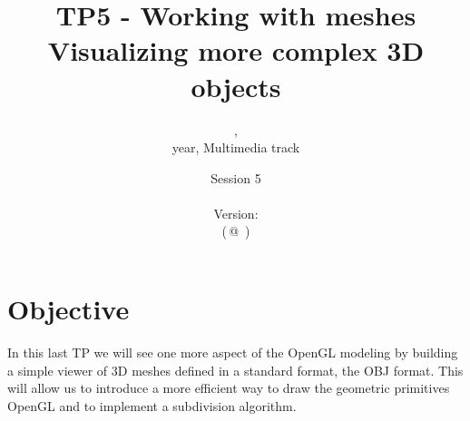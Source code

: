 \documentclass[a4paper,11pt]{article}
\title{\sf\bfseries TP5 - Working with meshes \\ {\small Visualizing more complex 3D objects}}
\author{\course, \ayearSecond\\ \nth{2} year, Multimedia track}
\date{Session 5\\~\\{\small Version: \gitReln{} \\\vskip -2mm {\tiny (\gitBranch\,@\,\gitAbbrevHash{} \gitAuthorDate)}}}
\newcommand{\hilight}[1]{\colorbox{bg}{#1}}
\newcommand{\coden}[1]{\texttt{#1}}
\newcommand{\code}[1]{\hilight{\texttt{#1}}}
\newcommand{\brand}[1]{\textsf{#1}\xspace}
\newcommand{\opengl}{\brand{OpenGL}}
\newcommand{\GLUT}{\brand{GLUT}}
\newcommand{\glut}{\GLUT}
\newcommand{\obj}{\brand{OBJ}}
\begin{document}
\maketitle
\textsf{\tableofcontents}

\section{Objective}
In this last TP we will see one more aspect of the \opengl modeling by building a simple viewer of 3D meshes defined in a standard format, the \obj format. This will allow us to introduce a more efficient way to draw the geometric primitives \opengl and to implement a subdivision algorithm.






\end{document}
